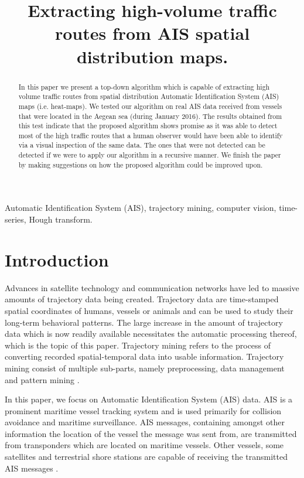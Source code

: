 \documentclass{article}
\title{Extracting high-volume traffic routes from AIS spatial distribution maps.}
\begin{document}
%
\maketitle
%
\begin{abstract}
In this paper we present a top-down algorithm which is capable of extracting high volume traffic routes from spatial distribution Automatic Identification System (AIS) maps (i.e. heat-maps).
We tested our algorithm on real AIS data received from vessels that were located in the Aegean sea (during January 2016). The results obtained from this test 
indicate that the proposed algorithm shows promise as it was able to detect most of the high traffic routes that a human observer would have been able to identify via a visual inspection of the same data. The ones that were not detected can be detected if we were 
to apply our algorithm in a recursive manner. We finish the paper by making suggestions on how the proposed algorithm could be improved upon.
\end{abstract}
%
\begin{keywords}
Automatic Identification System (AIS), trajectory mining, computer vision, time-series, Hough transform.
\end{keywords}

\section{Introduction}
Advances in satellite technology and communication networks have led to massive amounts of trajectory data being created. 
Trajectory data are time-stamped spatial coordinates of humans, vessels or animals and can be used to study their long-term behavioral patterns. The large increase 
in the amount of trajectory data which is now readily available necessitates the automatic processing thereof, which is the topic of this paper.
Trajectory mining refers to the process of converting recorded spatial-temporal data into usable information. Trajectory mining consist of multiple sub-parts, namely 
preprocessing, data management and pattern mining \cite{zheng2015}.

In this paper, we focus on Automatic Identification System (AIS) data. AIS is a prominent maritime vessel tracking system and is used primarily 
for collision avoidance and maritime surveillance. AIS messages, containing amongst other information the location of the vessel the message was sent from, are transmitted from transponders which are located 
on maritime vessels. Other vessels, some satellites and terrestrial shore stations are capable of receiving the transmitted AIS messages \cite{li2017}.
\end{document}
